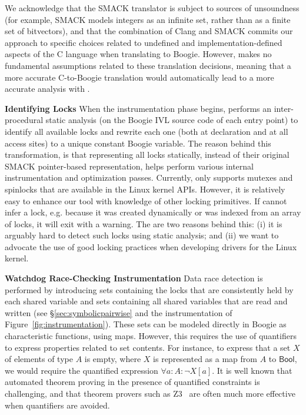 We acknowledge that the SMACK translator is subject to sources of
unsoundness (for example, SMACK models integers as an infinite set,
rather than as a finite set of bitvectors), and that the combination
of Clang and SMACK commits our approach to specific choices related to
undefined and implementation-defined aspects of the C language when
translating to Boogie.  However, \whoop makes no fundamental
assumptions related to these translation decisions, meaning that a
more accurate C-to-Boogie translation would automatically lead to a
more accurate analysis with \whoop.

\medskip\noindent\textbf{Identifying Locks }
%
When the instrumentation phase begins, \whoop performs an inter-procedural static analysis (on the Boogie IVL source code of each entry point) to identify all available locks and rewrite each one (both at declaration and at all access sites) to a unique constant Boogie variable. The reason behind this transformation, is that representing all locks statically, instead of their original SMACK pointer-based representation, helps \whoop perform various internal instrumentation and optimization passes.
%
Currently, \whoop only supports mutexes and spinlocks that are available in the Linux kernel APIs. However, it is relatively easy to enhance our tool with knowledge of other locking primitives. If \whoop cannot infer a lock, e.g. because it was created dynamically or was indexed from an array of locks, it will exit with a warning. The are two reasons behind this: (i) it is arguably hard to detect such locks using static analysis; and (ii) we want to advocate the use of good locking practices when developing drivers for the Linux kernel.  

\medskip\noindent\textbf{Watchdog Race-Checking Instrumentation }
%
Data race detection is performed by introducing sets containing the locks that are consistently held by each shared variable and sets containing all shared variables that are read and written (see \S\ref{sec:symbolicpairwise} and the instrumentation of Figure~\ref{fig:instrumentation}). These sets can be modeled directly in Boogie as characteristic functions, using maps. However, this requires the use of quantifiers to express properties related to set contents.  For instance, to express that a set $X$ of elements of type $A$ is empty, where $X$ is represented as a map from $A$ to $\mathsf{Bool}$, we would require the quantified expression $\forall a : A : \neg X[a]$.  It is well known that automated theorem proving in the presence of quantified constraints is challenging, and that theorem provers such as Z3~\cite{de2008z3} are often much more effective when quantifiers are avoided.  

